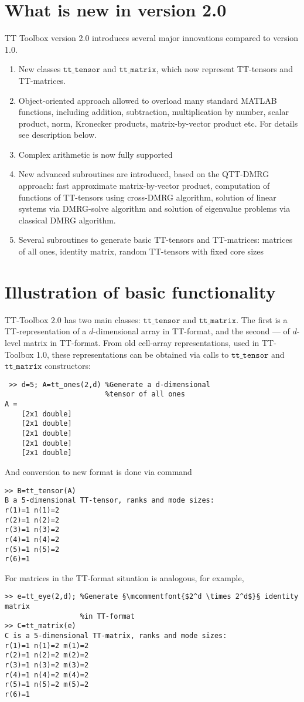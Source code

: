 \documentclass[a4paper,12pt,twoside]{article}
\def\tt{\texttt{tt\_tensor}}
\def\ttm{\texttt{tt\_matrix}}
\begin{document}
\section{What is new in version 2.0}
  TT Toolbox version 2.0 introduces several major innovations compared to version 1.0. \\
  \begin{enumerate}
  \item New classes $\tt$ and $\ttm$, which now represent TT-tensors and TT-matrices.
  \item Object-oriented approach allowed to overload many standard MATLAB functions, including addition, subtraction, 
  multiplication by number, scalar product, norm, Kronecker products, matrix-by-vector product etc. For details
 see description below.
  \item Complex arithmetic is now fully supported 
\item New advanced subroutines are introduced, based on the QTT-DMRG approach: fast approximate matrix-by-vector
product, computation of functions of TT-tensors using cross-DMRG algorithm, solution of linear systems via
  DMRG-solve algorithm and solution of eigenvalue problems via classical DMRG algorithm. 
 \item Several subroutines to generate basic TT-tensors and TT-matrices: matrices of all ones, identity matrix,
 random TT-tensors with fixed core sizes 
 \end{enumerate}
\section{Illustration of basic functionality}

TT-Toolbox 2.0 has two main classes: $\tt$ and $\ttm$. 
The first is a TT-representation of a $d$-dimensional array in TT-format, and the second --- of $d$-level 
matrix in TT-format. From  old cell-array representations, used in TT-Toolbox 1.0, 
these representations can be obtained via calls to $\tt$ and $\ttm$ constructors:


%

\begin{lstlisting}
 >> d=5; A=tt_ones(2,d) %Generate a d-dimensional 
                        %tensor of all ones
A = 
    [2x1 double]
    [2x1 double]
    [2x1 double]
    [2x1 double]
    [2x1 double]
\end{lstlisting}
And conversion to new format is done via command
\begin{lstlisting}
>> B=tt_tensor(A)
B a 5-dimensional TT-tensor, ranks and mode sizes: 
r(1)=1 n(1)=2
r(2)=1 n(2)=2
r(3)=1 n(3)=2
r(4)=1 n(4)=2
r(5)=1 n(5)=2
r(6)=1   
\end{lstlisting}
For matrices in the TT-format situation is analogous, for example,
\begin{lstlisting}
>> e=tt_eye(2,d); %Generate §\mcommentfont{$2^d \times 2^d$}§ identity matrix 
                  %in TT-format
>> C=tt_matrix(e)
C is a 5-dimensional TT-matrix, ranks and mode sizes: 
r(1)=1 n(1)=2 m(1)=2
r(2)=1 n(2)=2 m(2)=2
r(3)=1 n(3)=2 m(3)=2
r(4)=1 n(4)=2 m(4)=2
r(5)=1 n(5)=2 m(5)=2
r(6)=1     
\end{lstlisting}
\end{document}

